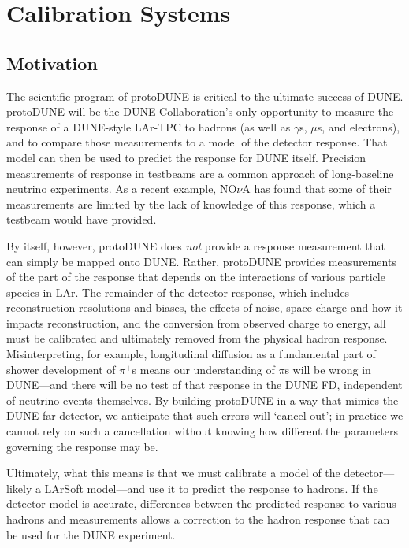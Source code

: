 
\section{Calibration Systems}
\subsection{Motivation}


	The scientific program of protoDUNE is critical to the ultimate success
of DUNE.  protoDUNE will be the DUNE Collaboration's only opportunity to
measure the response of a DUNE-style LAr-TPC to hadrons (as well as $\gamma$s,
$\mu$s, and electrons), and to compare those measurements to a model of the
detector response. That model can then be used to predict the response for DUNE
itself.  Precision measurements of response in testbeams are a common approach
of long-baseline neutrino experiments. As a recent example, NO{$\nu$}A has
found that some of their measurements are limited by the lack of knowledge of
this response, which a testbeam would have provided.
	
	By itself, however, protoDUNE does {\it not} provide a response
measurement that can simply be mapped onto DUNE.  Rather, protoDUNE provides
measurements of the part of the response that depends on the interactions of
various particle species in LAr.  The remainder of the detector response, which
includes reconstruction resolutions and biases, the effects of noise, space
charge and how it impacts reconstruction, and the conversion from observed
charge to energy, all must be calibrated and ultimately removed from the
physical hadron response.  Misinterpreting, for example, longitudinal diffusion
as a fundamental part of shower development of $\pi^+$s means our understanding
of $\pi$s will be wrong in DUNE---and there will be no test of that response in
the DUNE FD, independent of neutrino events themselves.  By building protoDUNE
in a way that mimics the DUNE far detector, we anticipate that such errors will
`cancel out'; in practice we cannot rely on such a cancellation without knowing
how different the parameters governing the response may be.

	Ultimately, what this means is that we must calibrate a model of the
detector---likely a LArSoft model---and use it to predict the response to
hadrons.  If the detector model is accurate, differences between the predicted
response to various hadrons and measurements allows a correction to the hadron
response that can be used for the DUNE experiment.  

